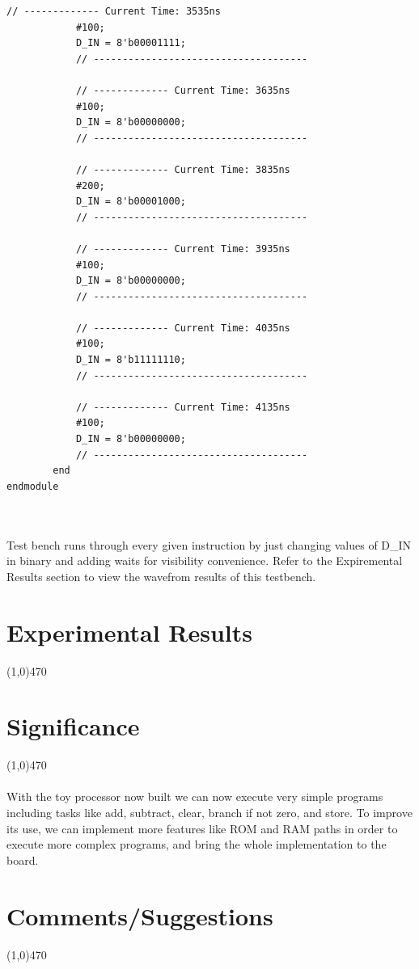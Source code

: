 \documentclass[12pt]{article}
\begin{document}
\begin{Verbatim}[frame=single, fontsize= \small]
			// ------------- Current Time: 3535ns 
			#100;
			D_IN = 8'b00001111;
			// -------------------------------------
			
			// ------------- Current Time: 3635ns 
			#100;
			D_IN = 8'b00000000;
			// -------------------------------------
			
			// ------------- Current Time: 3835ns 
			#200;
			D_IN = 8'b00001000;
			// -------------------------------------
			
			// ------------- Current Time: 3935ns 
			#100;
			D_IN = 8'b00000000;
			// -------------------------------------
			
			// ------------- Current Time: 4035ns 
			#100;
			D_IN = 8'b11111110;
			// -------------------------------------
			
			// ------------- Current Time: 4135ns 
			#100;
			D_IN = 8'b00000000;
			// -------------------------------------
		end 
endmodule

	
		\end{Verbatim}
		Test bench runs through every given instruction by just changing values of D\_IN in binary and adding waits for visibility convenience. Refer to the Expiremental Results section to view the wavefrom results of this testbench.
			
\section{Experimental Results}\vspace{-.7cm} \line(1,0){470}

\begin{figure}[h]
    \centering
	\caption{}
\end{figure}

\begin{figure}[h]
    \centering
	\caption{}
\end{figure}

\begin{figure}[h]
    \centering
	\caption{}
\end{figure}

	\newpage
\section{Significance} \vspace{-.7cm} \line(1,0){470}
	\paragraph{} 
		With the toy processor now built we can now execute very simple programs including tasks like add, subtract, clear, branch if not zero, and store. To improve its use, we can implement more features like ROM and RAM paths in order to execute more complex programs, and bring the whole implementation to the board. 

 \section{Comments/Suggestions}\vspace{-.7cm} \line(1,0){470}
 	\paragraph{} 
		
\end{document}
